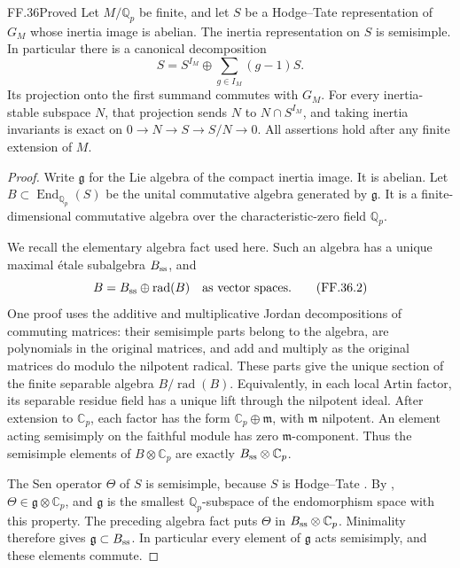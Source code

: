 \begin{claim}{FF.36}{Proved}\label{clm:FFabelianHT}
Let \(M/\mathbb Q_p\) be finite, and let \(S\)
be a Hodge--Tate representation of \(G_M\) whose
inertia image is abelian. The inertia representation
on \(S\) is semisimple. In particular there is a
canonical decomposition
\[
 S=S^{I_M}\oplus
       \sum_{g\in I_M}(g-1)S.                         \tag{FF.36.1}
\]
Its projection onto the first summand commutes
with \(G_M\). For every inertia-stable subspace
\(N\), that projection sends \(N\) to
\(N\cap S^{I_M}\), and taking inertia invariants
is exact on \(0\to N\to S\to S/N\to0\).
All assertions hold after any finite extension
of \(M\).
\end{claim}
\begin{proof}
Write \(\mathfrak g\) for the Lie algebra of
the compact inertia image. It is abelian.
Let \(B\subset\operatorname{End}_{\mathbb Q_p}(S)\)
be the unital commutative algebra generated by
\(\mathfrak g\). It is a finite-dimensional
commutative algebra over the characteristic-zero
field \(\mathbb Q_p\).

We recall the elementary algebra fact used
here. Such an algebra has a unique maximal
\'etale subalgebra \(B_{\rm ss}\), and
\[
           B=B_{\rm ss}\oplus\operatorname{rad}(B)
                         \quad\text{as vector spaces}.
                                                        \tag{FF.36.2}
\]
One proof uses the additive and multiplicative
Jordan decompositions of commuting matrices:
their semisimple parts belong to the algebra,
are polynomials in the original matrices, and
add and multiply as the original matrices do
modulo the nilpotent radical. These parts
give the unique section of the finite separable
algebra \(B/\operatorname{rad}(B)\). Equivalently,
in each local Artin factor, its separable residue
field has a unique lift through the nilpotent
ideal. After extension to \(\mathbb C_p\),
each factor has the form
\(\mathbb C_p\oplus\mathfrak m\), with
\(\mathfrak m\) nilpotent. An element acting
semisimply on the faithful module has zero
\(\mathfrak m\)-component. Thus the semisimple
elements of \(B\otimes\mathbb C_p\) are exactly
\(B_{\rm ss}\otimes\mathbb C_p\).

The Sen operator \(\Theta\) of \(S\) is
semisimple, because \(S\) is Hodge--Tate
\citep[Section~2.7]{FF_Fontaine2004}.
By \citet[Theorem~3.1, \(d=0\)]{FF_Ohkubo2014},
\(\Theta\in\mathfrak g\otimes\mathbb C_p\),
and \(\mathfrak g\) is the smallest
\(\mathbb Q_p\)-subspace of the endomorphism
space with this property. The preceding
algebra fact puts \(\Theta\) in
\(B_{\rm ss}\otimes\mathbb C_p\). Minimality
therefore gives \(\mathfrak g\subset B_{\rm ss}\).
In particular every element of \(\mathfrak g\)
acts semisimply, and these elements commute.


\end{proof}
